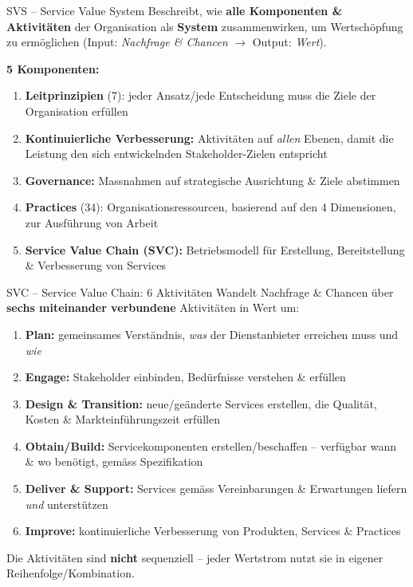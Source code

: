 \documentclass[a4paper, fontsize=7pt]{scrartcl}
\begin{document}
\begin{mainbox}{SVS -- Service Value System}
Beschreibt, wie \textbf{alle Komponenten \& Aktivitäten} der Organisation
als \textbf{System} zusammenwirken, um Wertschöpfung zu ermöglichen
(Input: \emph{Nachfrage \& Chancen} $\to$ Output: \emph{Wert}).

\textbf{5 Komponenten:}
\begin{enumerate}
    \item \textbf{Leitprinzipien} (7): jeder Ansatz/jede Entscheidung muss
          die Ziele der Organisation erfüllen
    \item \textbf{Kontinuierliche Verbesserung:} Aktivitäten auf
          \emph{allen} Ebenen, damit die Leistung den sich entwickelnden
          Stakeholder-Zielen entspricht
    \item \textbf{Governance:} Massnahmen auf strategische Ausrichtung \&
          Ziele abstimmen
    \item \textbf{Practices} (34): Organisationsressourcen, basierend auf
          den 4 Dimensionen, zur Ausführung von Arbeit
    \item \textbf{Service Value Chain (SVC):} Betriebsmodell für Erstellung,
          Bereitstellung \& Verbesserung von Services
\end{enumerate}
\end{mainbox}

\begin{mainbox}{SVC -- Service Value Chain: 6 Aktivitäten}
Wandelt Nachfrage \& Chancen über \textbf{sechs miteinander verbundene}
Aktivitäten in Wert um:
\begin{enumerate}
    \item \textbf{Plan:} gemeinsames Verständnis, \emph{was} der
          Dienstanbieter erreichen muss und \emph{wie}
    \item \textbf{Engage:} Stakeholder einbinden, Bedürfnisse verstehen \&
          erfüllen
    \item \textbf{Design \& Transition:} neue/geänderte Services erstellen,
          die Qualität, Kosten \& Markteinführungszeit erfüllen
    \item \textbf{Obtain/Build:} Servicekomponenten erstellen/beschaffen --
          verfügbar wann \& wo benötigt, gemäss Spezifikation
    \item \textbf{Deliver \& Support:} Services gemäss Vereinbarungen \&
          Erwartungen liefern \emph{und} unterstützen
    \item \textbf{Improve:} kontinuierliche Verbesserung von Produkten,
          Services \& Practices
\end{enumerate}
Die Aktivitäten sind \textbf{nicht} sequenziell -- jeder Wertstrom nutzt sie
in eigener Reihenfolge/Kombination.
\end{mainbox}
\end{document}
